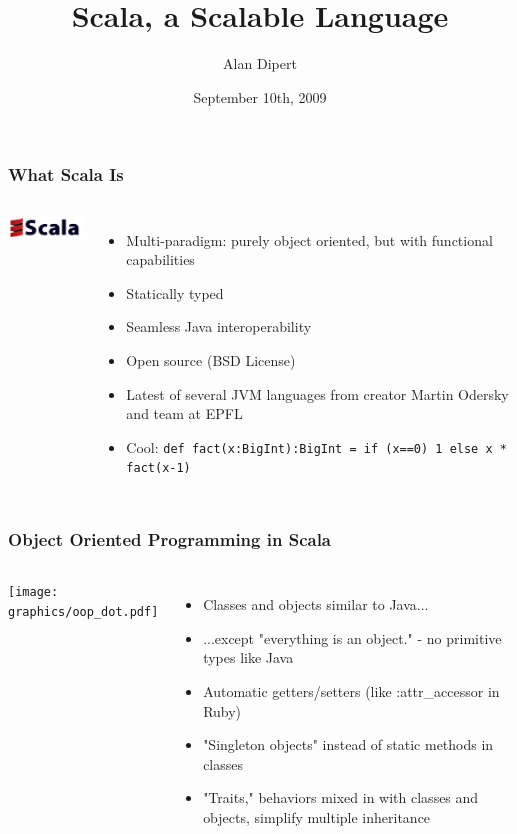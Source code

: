 \documentclass[hyperref={colorlinks=true}]{beamer}
\title{Scala, a Scalable Language}
\author{Alan Dipert}
\date{September 10th, 2009}
\begin{document}
 
\maketitle 

\begin{frame} 
\frametitle{What Scala Is}
\begin{columns}[c]
  \column{0.5in}
    \includegraphics[width=1.0in]{graphics/scala_logo.png} 
  \column{2.5in}
    \begin{itemize}
      \item<1-> Multi-paradigm: purely object oriented, but with functional capabilities
      \item<2-> Statically typed
      \item<3-> Seamless Java interoperability
      \item<4-> Open source (BSD License)
      \item<5-> Latest of several JVM languages from creator Martin Odersky and team at EPFL
      \item<6-> Cool: \tt\small{def fact(x:BigInt):BigInt = if (x==0) 1 else x * fact(x-1)}
    \end{itemize}
\end{columns}
\end{frame} 

\begin{frame} 
\frametitle{Object Oriented Programming in Scala}
\begin{columns}[c]
  \column{1.0in}
    \texttt{[image: graphics/oop\_dot.pdf]} 
  \column{2.0in}
    \begin{itemize}
      \item<1-> Classes and objects similar to Java...
      \item<2-> ...except "everything is an object." - no primitive types like Java
      \item<3-> Automatic getters/setters (like :attr\_accessor in Ruby)
      \item<4-> "Singleton objects" instead of static methods in classes
      \item<5-> "Traits," behaviors mixed in with classes and objects, simplify multiple inheritance
    \end{itemize}
\end{columns}
\end{frame} 
\end{document}
